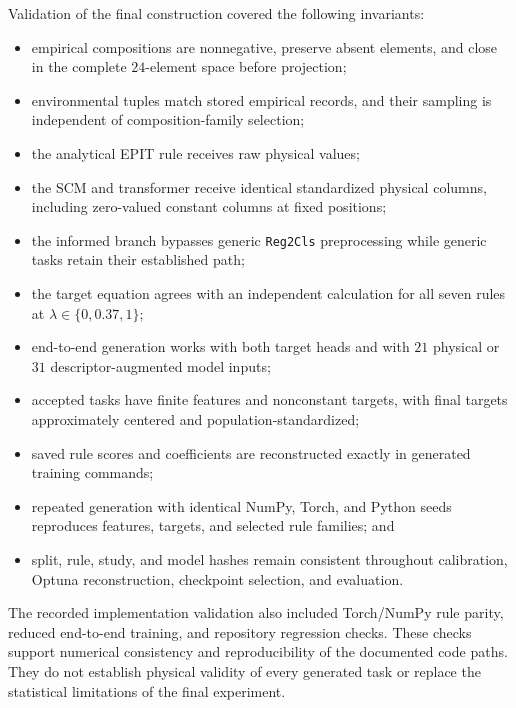 \documentclass{article}
\begin{document}
Validation of the final construction covered the following invariants:
\begin{itemize}
    \item empirical compositions are nonnegative, preserve absent elements,
    and close in the complete \(24\)-element space before projection;
    \item environmental tuples match stored empirical records, and their
    sampling is independent of composition-family selection;
    \item the analytical EPIT rule receives raw physical values;
    \item the SCM and transformer receive identical standardized physical
    columns, including zero-valued constant columns at fixed positions;
    \item the informed branch bypasses generic \texttt{Reg2Cls}
    preprocessing while generic tasks retain their established path;
    \item the target equation agrees with an independent calculation for all
    seven rules at \(\lambda\in\{0,0.37,1\}\);
    \item end-to-end generation works with both target heads and with
    \(21\) physical or \(31\) descriptor-augmented model inputs;
    \item accepted tasks have finite features and nonconstant targets, with
    final targets approximately centered and population-standardized;
    \item saved rule scores and coefficients are reconstructed exactly in
    generated training commands;
    \item repeated generation with identical NumPy, Torch, and Python seeds
    reproduces features, targets, and selected rule families; and
    \item split, rule, study, and model hashes remain consistent throughout
    calibration, Optuna reconstruction, checkpoint selection, and evaluation.
\end{itemize}

The recorded implementation validation also included Torch/NumPy rule parity,
reduced end-to-end training, and repository regression checks. These checks
support numerical consistency and reproducibility of the documented code
paths. They do not establish physical validity of every generated task or
replace the statistical limitations of the final experiment.
\end{document}
